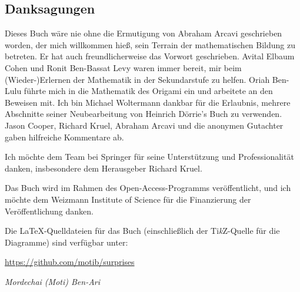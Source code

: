 \subsection*{Danksagungen}

Dieses Buch wäre nie ohne die Ermutigung von Abraham Arcavi geschrieben worden, der mich willkommen hieß, sein Terrain der mathematischen Bildung zu betreten. Er hat auch freundlicherweise das Vorwort geschrieben. Avital Elbaum Cohen und Ronit Ben-Bassat Levy waren immer bereit, mir beim (Wieder-)Erlernen der Mathematik in der Sekundarstufe zu helfen. Oriah Ben-Lulu führte mich in die Mathematik des Origami ein und arbeitete an den Beweisen mit. Ich bin Michael Woltermann dankbar für die Erlaubnis, mehrere Abschnitte seiner Neubearbeitung von Heinrich D\"{o}rrie's Buch zu verwenden. Jason Cooper, Richard Kruel, Abraham Arcavi und die anonymen Gutachter gaben hilfreiche Kommentare ab.

Ich möchte dem Team bei Springer für seine Unterstützung und Professionalität danken, insbesondere dem Herausgeber Richard Kruel.

Das Buch wird im Rahmen des Open-Access-Programms veröffentlicht, und ich möchte dem Weizmann Institute of Science für die Finanzierung der Veröffentlichung danken.

Die \LaTeX{}-Quelldateien für das Buch (einschließlich der Ti\textit{k}Z-Quelle für die Diagramme) sind verfügbar unter:
\begin{center}
\url{https://github.com/motib/surprises}
\end{center}

\medskip

\begin{flushright}
\textit{Mordechai (Moti) Ben-Ari}
\end{flushright}

\tableofcontents
